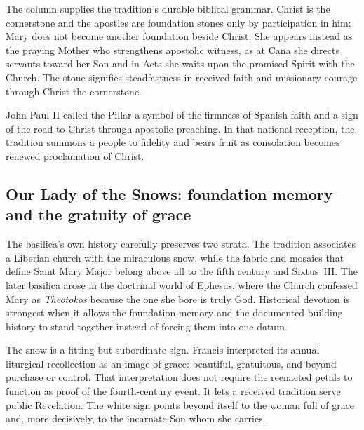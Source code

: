 The column supplies the tradition's durable biblical grammar. Christ is the cornerstone and the apostles are foundation stones only by participation in him; Mary does not become another foundation beside Christ. She appears instead as the praying Mother who strengthens apostolic witness, as at Cana she directs servants toward her Son and in Acts she waits upon the promised Spirit with the Church. The stone signifies steadfastness in received faith and missionary courage through Christ the cornerstone.

John Paul II called the Pillar a symbol of the firmness of Spanish faith and a sign of the road to Christ through apostolic preaching. In that national reception, the tradition summons a people to fidelity and bears fruit as consolation becomes renewed proclamation of Christ.

\subsection{Our Lady of the Snows: foundation memory and the gratuity of grace}


The basilica's own history carefully preserves two strata. The tradition associates a Liberian church with the miraculous snow, while the fabric and mosaics that define Saint Mary Major belong above all to the fifth century and Sixtus~III. The later basilica arose in the doctrinal world of Ephesus, where the Church confessed Mary as \emph{Theotokos} because the one she bore is truly God. Historical devotion is strongest when it allows the foundation memory and the documented building history to stand together instead of forcing them into one datum.

The snow is a fitting but subordinate sign. Francis interpreted its annual liturgical recollection as an image of grace: beautiful, gratuitous, and beyond purchase or control. That interpretation does not require the reenacted petals to function as proof of the fourth-century event. It lets a received tradition serve public Revelation. The white sign points beyond itself to the woman full of grace and, more decisively, to the incarnate Son whom she carries.

